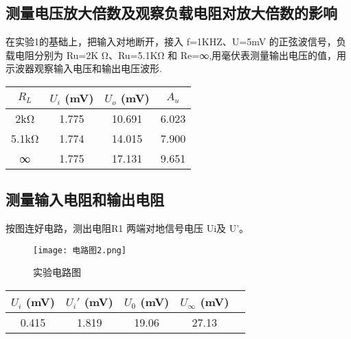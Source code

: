 \documentclass[dvipsnames, svgnames,a4paper,11pt]{article}
\begin{document}
	\subsection{测量电压放大倍数及观察负载电阻对放大倍数的影响}
	在实验1的基础上，把输入对地断开，接入 f=1KHZ、U=5mV 的正弦波信号，负载电阻分别为 Ru=2K Ω、Ru=5.1KΩ 和 Re=∞,用毫伏表测量输出电压的值，用示波器观察输入电压和输出电压波形.
	\begin{center}
		\begin{tabular}{|c|c|c|c|}
		\hline
		$R_L$ & $U_i$ (mV) & $U_o$ (mV) & $A_u$ \\
		\hline
		2kΩ   & 1.775     & 10.691    & 6.023  \\
		5.1kΩ & 1.774     & 14.015    & 7.900  \\
		∞     & 1.775     & 17.131    & 9.651  \\
		\hline
		\end{tabular}
		\end{center}
		\subsection{测量输入电阻和输出电阻}	
		按图连好电路，测出电阻R1 两端对地信号电压 Ui及 U'。
		

\begin{figure}[{H}]
	\centering
	\texttt{[image: 电路图2.png]}
	\caption{实验电路图}
	\label{}
\end{figure}
\begin{center}
			\begin{tabular}{|c|c|c|c|c|}
			\hline
			$U_i$ (mV) & $U_i'$ (mV) & $U_0$ (mV) & $U_\infty$ (mV) \\
			\hline
					0.415  & 1.819       & 19.06    & 27.13\\
			\hline
			\end{tabular}
			\end{center}
\end{document}
